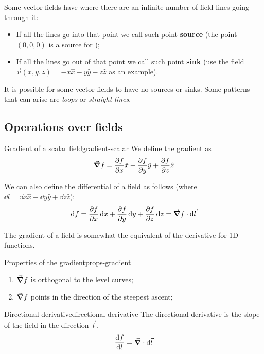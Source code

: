 \documentclass[12pt]{extarticle}
\begin{document}
Some vector fields have  where there are an infinite number of field lines going through it:
\begin{itemize}
	\item If all the lines go into that point we call such point \textbf{source} (the point $(0,0,0)$ is a source for );
	\item If all the lines go out of that point we call such point \textbf{sink} (use the field $\vec v(x, y, z) = -x \hat x - y \hat y - z \hat z$ as an example).
\end{itemize}
It is possible for some vector fields to have no sources or sinks. Some patterns that can arise are \textit{loops} or \textit{straight lines}.

\subsection{Operations over fields}

\begin{definition}{Gradient of a scalar field}{gradient-scalar}
	We define the gradient as
	\begin{equation}
		\grad f = \pdv{f}{x} \hat{x} + \pdv{f}{y} \hat{y} + \pdv{f}{z} \hat{z}
	\end{equation}

	We can also define the differential of a field as follows (where $\dd{l} = \dd{x} \hat{x} + \dd{y} \hat{y} + \dd{z} \hat{z} $):
	\begin{equation}
		\dd{f} = \pdv{f}{x} \dd{x} + \pdv{f}{y} \dd{y} + \pdv{f}{z} \dd{z} = \grad f \cdot \dd{\vec l}
	\end{equation}
\end{definition}

The gradient of a field is somewhat the equivalent of the derivative for 1D functions.

\begin{proposition}{Properties of the gradient}{props-gradient}
	\begin{enumerate}[label=\roman*.]
		\item $\grad f$ is orthogonal to the level curves;
		\item $\grad f$ points in the direction of the steepest ascent;
	\end{enumerate}
\end{proposition}

\begin{definition}{Directional derivative}{directional-derivative}
	The directional derivative is the slope of the field in the direction $\vec l$.
	\begin{equation}
		\dv{f}{l} = \grad \cdot \dd{\vec l}
	\end{equation}
\end{definition}
\end{document}
